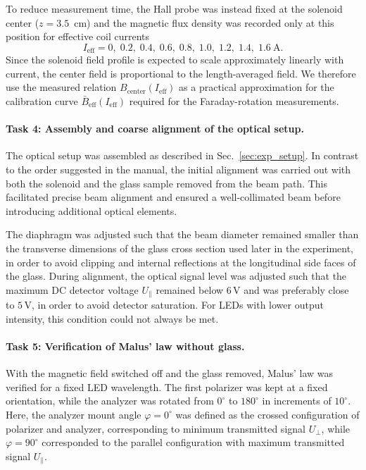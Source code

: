 \documentclass[a4paper]{article}
\begin{document}
To reduce measurement time, the Hall probe was instead fixed at the solenoid center ($z = 3.5$~cm) and the magnetic flux density was recorded only at this position for effective coil currents
\[
  I_{\mathrm{eff}} = 0,\;0.2,\;0.4,\;0.6,\;0.8,\;1.0,\;1.2,\;1.4,\;1.6~\mathrm{A}.
\]
Since the solenoid field profile is expected to scale approximately linearly with current, the center field is proportional to the length-averaged field.
We therefore use the measured relation $B_{\mathrm{center}}(I_{\mathrm{eff}})$ as a practical approximation for the calibration curve $\bar{B}_{\mathrm{eff}}(I_{\mathrm{eff}})$ required for the Faraday-rotation measurements.

\paragraph{\textbf{Task 4: Assembly and coarse alignment of the optical setup.}}
The optical setup was assembled as described in Sec.~\ref{sec:exp_setup}.
In contrast to the order suggested in the manual, the initial alignment was carried out with both the solenoid and the glass sample removed from the beam path.
This facilitated precise beam alignment and ensured a well-collimated beam before introducing additional optical elements.

The diaphragm was adjusted such that the beam diameter remained smaller than the transverse dimensions of the glass cross section used later in the experiment, in order to avoid clipping and internal reflections at the longitudinal side faces of the glass.
During alignment, the optical signal level was adjusted such that the maximum DC detector voltage $U_{\parallel}$ remained below $6\,\mathrm{V}$ and was preferably close to $5\,\mathrm{V}$, in order to avoid detector saturation.
For LEDs with lower output intensity, this condition could not always be met.

\paragraph{\textbf{Task 5: Verification of Malus' law without glass.}}
With the magnetic field switched off and the glass removed, Malus’ law was verified for a fixed LED wavelength.
The first polarizer was kept at a fixed orientation, while the analyzer was rotated from $0^\circ$ to $180^\circ$ in increments of $10^\circ$.
Here, the analyzer mount angle $\varphi = 0^\circ$ was defined as the crossed configuration of polarizer and analyzer, corresponding to minimum transmitted signal $U_{\perp}$, while $\varphi = 90^\circ$ corresponded to the parallel configuration with maximum transmitted signal $U_{\parallel}$.
\end{document}
